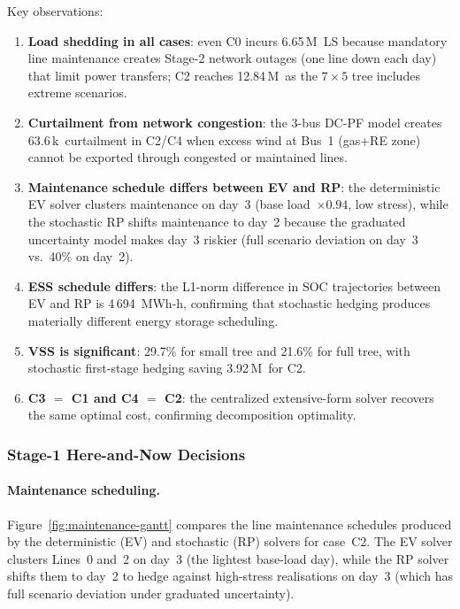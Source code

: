 \documentclass[11pt]{article}
\begin{document}
Key observations:
\begin{enumerate}
  \item \textbf{Load shedding in all cases}: even C0 incurs
        6.65\,M\textyen\ LS because mandatory line maintenance
        creates Stage-2 network outages (one line down each day)
        that limit power transfers; C2 reaches 12.84\,M\textyen\
        as the $7{\times}5$ tree includes extreme scenarios.
  \item \textbf{Curtailment from network congestion}: the 3-bus DC-PF
        model creates 63.6\,k\textyen\ curtailment in C2/C4 when
        excess wind at Bus~1 (gas+RE zone) cannot be exported through
        congested or maintained lines.
  \item \textbf{Maintenance schedule differs between EV and RP}:
        the deterministic EV solver clusters maintenance
        on day~3 (base load~$\times 0.94$, low stress), while the
        stochastic RP shifts maintenance to day~2 because the
        graduated uncertainty model makes day~3 riskier
        (full scenario deviation on day~3 vs.\ 40\% on day~2).
  \item \textbf{ESS schedule differs}: the L1-norm difference in
        SOC trajectories between EV and RP is 4\,694~MWh-h,
        confirming that stochastic hedging produces materially
        different energy storage scheduling.
  \item \textbf{VSS is significant}: 29.7\% for small tree and
        21.6\% for full tree, with stochastic first-stage hedging
        saving 3.92\,M\textyen\ for C2.
  \item \textbf{C3 $=$ C1 and C4 $=$ C2}: the centralized
        extensive-form solver recovers the same optimal cost,
        confirming decomposition optimality.
\end{enumerate}

\subsubsection{Stage-1 Here-and-Now Decisions}

\paragraph{Maintenance scheduling.}
Figure~\ref{fig:maintenance-gantt} compares the line maintenance
schedules produced by the deterministic (EV) and stochastic (RP)
solvers for case~C2. The EV solver clusters Lines~0 and~2 on
day~3 (the lightest base-load day), while the RP solver shifts
them to day~2 to hedge against high-stress realisations on day~3
(which has full scenario deviation under graduated uncertainty).
\end{document}
